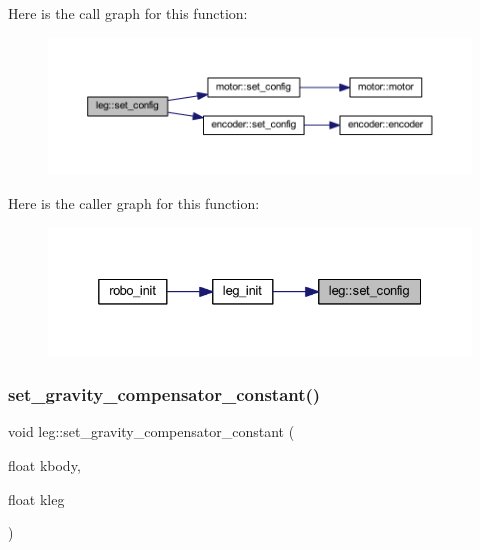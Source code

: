 Here is the call graph for this function\+:
\nopagebreak
\begin{figure}[H]
\begin{center}
\leavevmode
\includegraphics[width=350pt]{classleg_aa2d623fc4e7182491a8fdc9d1d21b378_cgraph}
\end{center}
\end{figure}
Here is the caller graph for this function\+:
\nopagebreak
\begin{figure}[H]
\begin{center}
\leavevmode
\includegraphics[width=332pt]{classleg_aa2d623fc4e7182491a8fdc9d1d21b378_icgraph}
\end{center}
\end{figure}
\mbox{\label{classleg_a2ef282bddb5ac1f2583a3230782c59fd}} 
\subsubsection{\texorpdfstring{set\_gravity\_compensator\_constant()}{set\_gravity\_compensator\_constant()}}
{\footnotesize\ttfamily void leg\+::set\+\_\+gravity\+\_\+compensator\+\_\+constant (\begin{DoxyParamCaption}\item[{float}]{kbody,  }\item[{float}]{kleg }\end{DoxyParamCaption})\hspace{0.3cm}{\ttfamily [inline]}}



